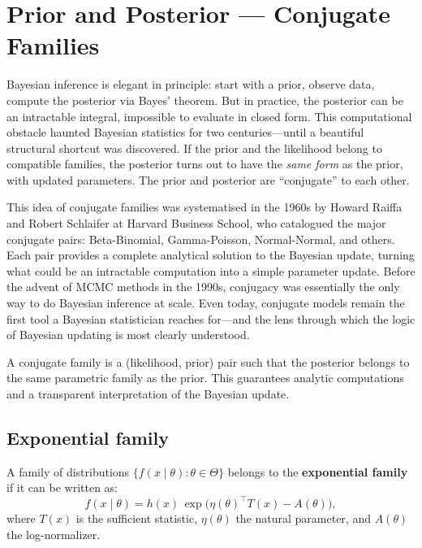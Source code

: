 \chapter{Prior and Posterior --- Conjugate Families}
\label{ch:conjugacy}

Bayesian inference is elegant in principle: start with a prior, observe data, compute the posterior via Bayes' theorem. But in practice, the posterior can be an intractable integral, impossible to evaluate in closed form. This computational obstacle haunted Bayesian statistics for two centuries---until a beautiful structural shortcut was discovered. If the prior and the likelihood belong to compatible families, the posterior turns out to have the \emph{same form} as the prior, with updated parameters. The prior and posterior are ``conjugate'' to each other.

This idea of conjugate families was systematised in the 1960s by Howard Raiffa and Robert Schlaifer at Harvard Business School, who catalogued the major conjugate pairs: Beta-Binomial, Gamma-Poisson, Normal-Normal, and others. Each pair provides a complete analytical solution to the Bayesian update, turning what could be an intractable computation into a simple parameter update. Before the advent of MCMC methods in the 1990s, conjugacy was essentially the only way to do Bayesian inference at scale. Even today, conjugate models remain the first tool a Bayesian statistician reaches for---and the lens through which the logic of Bayesian updating is most clearly understood.

\begin{intuition}[title=\textbf{Central idea}]
A conjugate family is a (likelihood, prior) pair such that the posterior
belongs to the same parametric family as the prior. This guarantees
analytic computations and a transparent interpretation of the Bayesian
update.
\end{intuition}

\section{Exponential family}

\begin{definition}
A family of distributions $\{f(x \mid \theta) : \theta \in \Theta\}$
belongs to the \textbf{exponential family} if it can be written as:
\[
  f(x \mid \theta) = h(x)\,\exp\!\big(\eta(\theta)^\top T(x) - A(\theta)\big),
\]
where $T(x)$ is the sufficient statistic, $\eta(\theta)$ the natural
parameter, and $A(\theta)$ the log-normalizer.
\end{definition}

